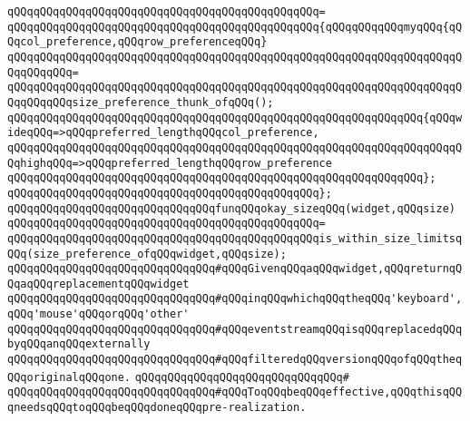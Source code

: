 \verb|qQQqqQQqqQQqqQQqqQQqqQQqqQQqqQQqqQQqqQQqqQQqqQQq=|\newline
\verb|qQQqqQQqqQQqqQQqqQQqqQQqqQQqqQQqqQQqqQQqqQQqqQQq{qQQqqQQqqQQqmyqQQq{qQQqcol_preference,qQQqrow_preferenceqQQq}|\newline
\verb|qQQqqQQqqQQqqQQqqQQqqQQqqQQqqQQqqQQqqQQqqQQqqQQqqQQqqQQqqQQqqQQqqQQqqQQqqQQqqQQq=|\newline
\verb|qQQqqQQqqQQqqQQqqQQqqQQqqQQqqQQqqQQqqQQqqQQqqQQqqQQqqQQqqQQqqQQqqQQqqQQqqQQqqQQqsize_preference_thunk_ofqQQq();|\newline
\newline
\verb|qQQqqQQqqQQqqQQqqQQqqQQqqQQqqQQqqQQqqQQqqQQqqQQqqQQqqQQqqQQqqQQq{qQQqwideqQQq=>qQQqpreferred_lengthqQQqcol_preference,|\newline
\verb|qQQqqQQqqQQqqQQqqQQqqQQqqQQqqQQqqQQqqQQqqQQqqQQqqQQqqQQqqQQqqQQqqQQqqQQqhighqQQq=>qQQqpreferred_lengthqQQqrow_preference|\newline
\verb|qQQqqQQqqQQqqQQqqQQqqQQqqQQqqQQqqQQqqQQqqQQqqQQqqQQqqQQqqQQqqQQq};|\newline
\verb|qQQqqQQqqQQqqQQqqQQqqQQqqQQqqQQqqQQqqQQqqQQqqQQq};|\newline
\newline
\newline
\verb|qQQqqQQqqQQqqQQqqQQqqQQqqQQqqQQqfunqQQqokay_sizeqQQq(widget,qQQqsize)|\newline
\verb|qQQqqQQqqQQqqQQqqQQqqQQqqQQqqQQqqQQqqQQqqQQqqQQq=|\newline
\verb|qQQqqQQqqQQqqQQqqQQqqQQqqQQqqQQqqQQqqQQqqQQqqQQqis_within_size_limitsqQQq(size_preference_ofqQQqwidget,qQQqsize);|\newline
\newline
\newline
\verb|qQQqqQQqqQQqqQQqqQQqqQQqqQQqqQQq#qQQqGivenqQQqaqQQqwidget,qQQqreturnqQQqaqQQqreplacementqQQqwidget|\newline
\verb|qQQqqQQqqQQqqQQqqQQqqQQqqQQqqQQq#qQQqinqQQqwhichqQQqtheqQQq'keyboard',qQQq'mouse'qQQqorqQQq'other'|\newline
\verb|qQQqqQQqqQQqqQQqqQQqqQQqqQQqqQQq#qQQqeventstreamqQQqisqQQqreplacedqQQqbyqQQqanqQQqexternally|\newline
\verb|qQQqqQQqqQQqqQQqqQQqqQQqqQQqqQQq#qQQqfilteredqQQqversionqQQqofqQQqtheqQQqoriginalqQQqone.|\newline
\verb|qQQqqQQqqQQqqQQqqQQqqQQqqQQqqQQq#|\newline
\verb|qQQqqQQqqQQqqQQqqQQqqQQqqQQqqQQq#qQQqToqQQqbeqQQqeffective,qQQqthisqQQqneedsqQQqtoqQQqbeqQQqdoneqQQqpre-realization.|\newline
